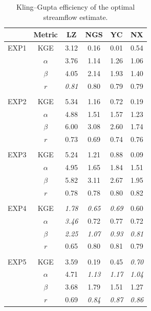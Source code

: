 \documentclass[draft]{agujournal2019}
\begin{document}
\begin{table}[h!]
      \centering
      \doublerulesep 0.3pt
      \renewcommand{\arraystretch}{1}  %
      \caption{Kling--Gupta efficiency of the optimal streamflow estimate.}
      \label{tab:rn_skill}
      \vspace*{5mm}
      \small
      \begin{tabular*}{80mm}{cccccc}
            \hline
            & Metric & LZ & NGS & YC & NX \\
            \hline
            EXP1 & KGE & \textminus{}3.12 & \textminus{}0.16 & 0.01 & 0.54 \\
            & $\alpha$ & 3.76 & 1.14 & 1.26 & 1.06 \\
            & $\beta$ & 4.05 & 2.14 & 1.93 & 1.40 \\
            & $r$ & \textit{0.81} & 0.80 & 0.79 & 0.79 \\
            \\
            EXP2 & KGE & \textminus{}5.34 & \textminus{}1.16 & \textminus{}0.72 & 0.19 \\
            & $\alpha$ & 4.88 & 1.51 & 1.57 & 1.23 \\
            & $\beta$ & 6.00 & 3.08 & 2.60 & 1.74 \\
            & $r$ & 0.73 & 0.69 & 0.74 & 0.76 \\
            \\
            EXP3 & KGE & \textminus{}5.24 & \textminus{}1.21 & \textminus{}0.88 & \textminus{}0.09 \\
            & $\alpha$ & 4.95 & 1.65 & 1.84 & 1.51 \\
            & $\beta$ & 5.82 & 3.11 & 2.67 & 1.95 \\
            & $r$ & 0.78 & 0.78 & 0.80 & 0.82 \\
            \\
            EXP4 & KGE & \textit{\textminus{}1.78} & \textit{0.65} & \textit{0.69} & 0.60 \\
            & $\alpha$ & \textit{3.46} & 0.72 & 0.77 & 0.72 \\
            & $\beta$ & \textit{2.25} & \textit{1.07} & \textit{0.93} & \textit{0.81} \\
            & $r$ & 0.65 & 0.80 & 0.81 & 0.79 \\
            \\
            EXP5 & KGE & \textminus{}3.59 & 0.19 & 0.45 & \textit{0.70} \\
            & $\alpha$ & 4.71 & \textit{1.13} & \textit{1.17} & \textit{1.04} \\
            & $\beta$ & 3.68 & 1.79 & 1.51 & 1.27 \\
            & $r$ & 0.69 & \textit{0.84} & \textit{0.87} & \textit{0.86} \\
            \hline
      \end{tabular*}
      \renewcommand{\arraystretch}{1}  %
\end{table}
\end{document}
